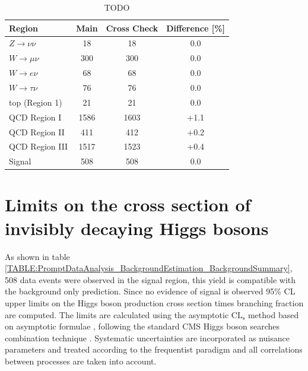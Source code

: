 \begin{table}[!htb]
\centering
\begin{tabular}{|l|c|c|c|}
\hline
Region                & Main & Cross Check & Difference [\%] \\
\hline\hline
$Z\rightarrow\nu\nu$  &   18 &          18 &             0.0 \\
$W\rightarrow\mu\nu$  &  300 &         300 &             0.0 \\
$W\rightarrow e\nu$   &   68 &          68 &             0.0 \\
$W\rightarrow\tau\nu$ &   76 &          76 &             0.0 \\
top (Region 1)        &   21 &          21 &             0.0 \\
QCD Region I          & 1586 &        1603 &            +1.1 \\
QCD Region II         &  411 &         412 &            +0.2 \\
QCD Region III        & 1517 &        1523 &            +0.4 \\
\hline\hline
Signal                &  508 &         508 &             0.0 \\
\hline
\end{tabular}
\caption{TODO}
\label{TABLE:ParkedDataAnalysis_Results_MainCrossCheckComparison}
\end{table}



\section{Limits on the cross section of invisibly decaying Higgs bosons}
\label{SECTION:ParkedDataAnalysis_Limits}


As shown in table \ref{TABLE:PromptDataAnalysis_BackgroundEstimation_BackgroundSummary}, 508 data events were observed in the signal region, this yield is compatible with the background only prediction. Since no evidence of signal is observed 95\% \gls{CL} upper limits on the Higgs boson production cross section times branching fraction are computed. The limits are calculated using the asymptotic $\mathrm{CL}_\mathrm{s}$ method \cite{ARTICLE:CLsTechnique,ARTICLE:CLCompForCombiningSearchesWithSmallStat,ARTICLE:HandbookofLHCHiggsCrossSectionsDifferentialDistributions} based on asymptotic formulae \cite{ARTICLE:AsymptoticCLS}, following the standard \gls{CMS} Higgs boson searches combination technique \cite{ARTICLE:CMS_HiggsDiscovery,ARTICLE:HiggsCombination}. Systematic uncertainties are incorporated as nuisance parameters and treated according to the frequentist paradigm \cite{ARTICLE:HiggsCombination} and all correlations between processes are taken into account.

